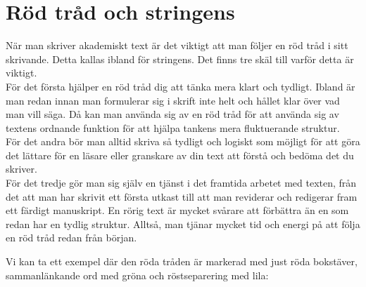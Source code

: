 \documentclass[11pt,a4paper,footinclude=true,headinclude=true]{report} %
\begin{document}
\printbibliography[heading=subbibliography]














    
    \chapter{Röd tråd och stringens}

\noindent När man skriver akademiskt text är det viktigt att man följer en röd tråd i sitt skrivande. Detta kallas ibland för stringens. Det finns tre skäl till varför detta är viktigt.\\
\indent För det första hjälper en röd tråd dig att tänka mera klart och tydligt. Ibland är man redan innan man formulerar sig i skrift inte helt och hållet  klar över vad man vill säga. Då kan man använda sig av en röd tråd för att använda sig av textens ordnande funktion för att hjälpa tankens mera fluktuerande struktur.\\
\indent För det andra bör man alltid skriva så tydligt och logiskt som möjligt för att göra det lättare för en läsare eller granskare av din text att förstå och bedöma det du skriver. \\
\indent För det tredje gör man sig själv en tjänst i det framtida arbetet med texten, från det att man har skrivit ett första utkast till att man reviderar och redigerar fram ett färdigt manuskript. En rörig text är mycket svårare att förbättra än en som redan har en tydlig struktur. Alltså, man tjänar mycket tid och energi på att följa en röd tråd redan från början.

Vi kan ta ett exempel där den röda tråden är markerad med just röda bokstäver, sammanlänkande ord med gröna och röstseparering med lila: 
\end{document}
